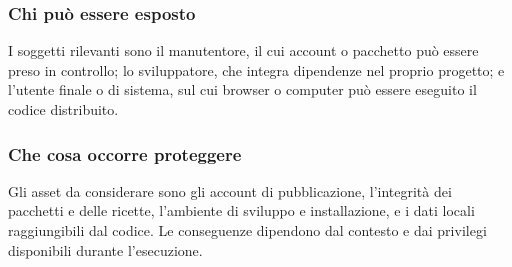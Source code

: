 \subsubsection{Chi può essere esposto}

I soggetti rilevanti sono il manutentore, il cui account o pacchetto può essere
preso in controllo; lo sviluppatore, che integra dipendenze nel proprio
progetto; e l'utente finale o di sistema, sul cui browser o computer può essere
eseguito il codice distribuito.

\subsubsection{Che cosa occorre proteggere}

Gli asset da considerare sono gli account di pubblicazione, l'integrità dei
pacchetti e delle ricette, l'ambiente di sviluppo e installazione, e i dati
locali raggiungibili dal codice. Le conseguenze dipendono dal contesto e dai
privilegi disponibili durante l'esecuzione.
